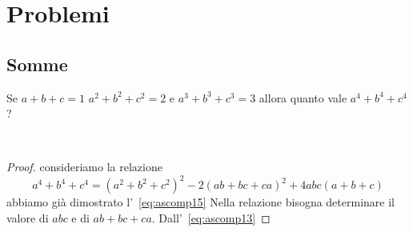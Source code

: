 \chapter{Problemi}
\section{Somme}
\begin{prob}
Se $a+b+c=1$ $a^2+b^2+c^2=2$ e $a^3+b^3+c^3=3$ allora quanto vale $a^4+b^4+c^4$?
\end{prob}~\cite{Gregorio2021}
\begin{proof}
consideriamo la relazione \[a^4+b^4+c^4=(a^2+b^2+c^2)^2-2(ab+bc+ca)^2+4abc(a+b+c)\] abbiamo già dimostrato l'~\vref{eq:ascomp15}
Nella relazione bisogna determinare il valore di $abc$ e di $ab+bc+ca$.
Dall'~\vref{eq:ascomp13}
\end{proof}